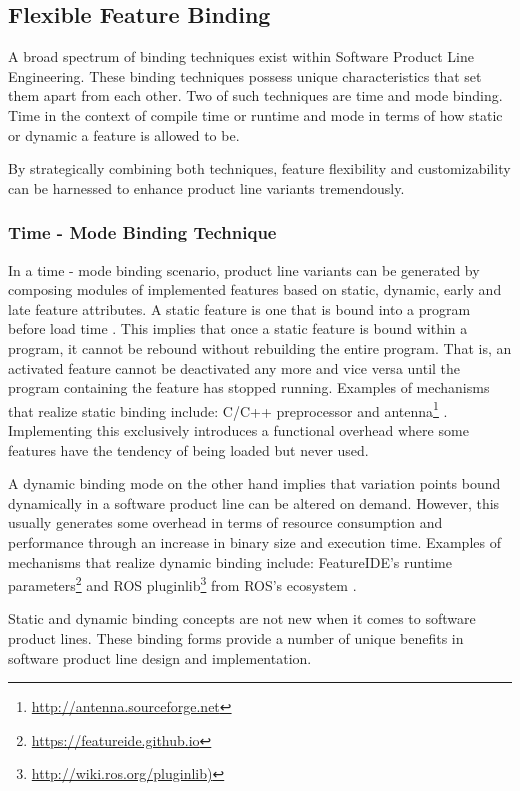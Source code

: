 \documentclass[conference]{IEEEtran}
\newcommand{\foot}[1]{\footnote{\url{#1}}}
\begin{document}
\subsection{Flexible Feature Binding}
A broad spectrum of binding techniques exist within Software Product Line Engineering. These binding techniques possess unique characteristics that set them apart from each other. Two of such techniques are time and mode binding. Time in the context of compile time or runtime and mode in terms of how static or dynamic a feature is allowed to be. 

By strategically combining both techniques, feature flexibility and customizability can be harnessed to enhance product line variants tremendously.

\subsubsection{Time - Mode Binding Technique}
In a time - mode binding scenario, product line variants can be generated by composing modules of implemented features based on static, dynamic, early and late feature attributes. A static feature is one that is bound into a program before load time \cite{flex-feat-bind}. This implies that once a static feature is bound within a program, it cannot be rebound without rebuilding the entire program. That is, an activated feature cannot be deactivated any more and vice versa until the program containing the feature has stopped running. Examples of mechanisms that realize static binding include: C/C++ preprocessor and antenna\foot{http://antenna.sourceforge.net} \cite{flex-feat-bind}. Implementing this exclusively introduces a functional overhead where some features have the tendency of being loaded but never used.

A dynamic binding mode on the other hand implies that variation points bound dynamically in a software product line can be altered on demand. However, this usually generates some overhead in terms of resource consumption and performance through an increase in binary size and execution time. Examples of mechanisms that realize dynamic binding include: FeatureIDE's runtime parameters\foot{https://featureide.github.io} and ROS pluginlib\foot{http://wiki.ros.org/pluginlib)} from ROS's ecosystem \cite{flex-feat-bind}.

Static and dynamic binding concepts are not new when it comes to software product lines. These binding forms provide a number of unique benefits in software product line design and implementation. 
\end{document}
